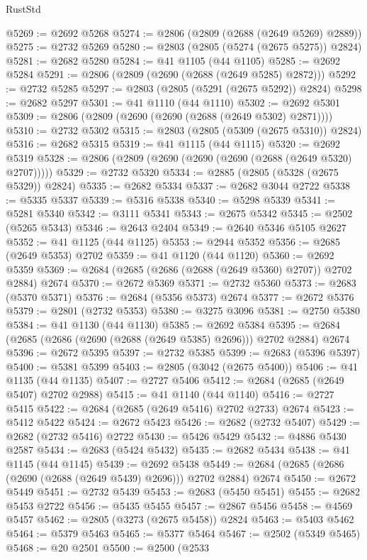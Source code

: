 \begin{lexlean}{RustStd}
\begin{coremodule}
@5269 := @2692 @5268
@5274 := @2806 (@2809 (@2688 (@2649 @5269) @2889))
@5275 := @2732 @5269
@5280 := @2803 (@2805 (@5274 (@2675 @5275)) @2824)
@5281 := @2682 @5280
@5284 := @41 @1105 (@44 @1105)
@5285 := @2692 @5284
@5291 := @2806 (@2809 (@2690 (@2688 (@2649 @5285) @2872)))
@5292 := @2732 @5285
@5297 := @2803 (@2805 (@5291 (@2675 @5292)) @2824)
@5298 := @2682 @5297
@5301 := @41 @1110 (@44 @1110)
@5302 := @2692 @5301
@5309 := @2806 (@2809 (@2690 (@2690 (@2688 (@2649 @5302) @2871))))
@5310 := @2732 @5302
@5315 := @2803 (@2805 (@5309 (@2675 @5310)) @2824)
@5316 := @2682 @5315
@5319 := @41 @1115 (@44 @1115)
@5320 := @2692 @5319
@5328 := @2806 (@2809 (@2690 (@2690 (@2690 (@2688 (@2649 @5320) @2707)))))
@5329 := @2732 @5320
@5334 := @2885 (@2805 (@5328 (@2675 @5329)) @2824)
@5335 := @2682 @5334
@5337 := @2682 @3044 @2722
@5338 := @5335 @5337
@5339 := @5316 @5338
@5340 := @5298 @5339
@5341 := @5281 @5340
@5342 := @3111 @5341
@5343 := @2675 @5342
@5345 := @2502 (@5265 @5343)
@5346 := @2643 @2404
@5349 := @2640 @5346 @5105 @2627
@5352 := @41 @1125 (@44 @1125)
@5353 := @2944 @5352
@5356 := @2685 (@2649 @5353) @2702
@5359 := @41 @1120 (@44 @1120)
@5360 := @2692 @5359
@5369 := @2684 (@2685 (@2686 (@2688 (@2649 @5360) @2707)) @2702 @2884) @2674
@5370 := @2672 @5369
@5371 := @2732 @5360
@5373 := @2683 (@5370 @5371)
@5376 := @2684 (@5356 @5373) @2674
@5377 := @2672 @5376
@5379 := @2801 (@2732 @5353)
@5380 := @3275 @3096
@5381 := @2750 @5380
@5384 := @41 @1130 (@44 @1130)
@5385 := @2692 @5384
@5395 := @2684 (@2685 (@2686 (@2690 (@2688 (@2649 @5385) @2696))) @2702 @2884) @2674
@5396 := @2672 @5395
@5397 := @2732 @5385
@5399 := @2683 (@5396 @5397)
@5400 := @5381 @5399
@5403 := @2805 (@3042 (@2675 @5400))
@5406 := @41 @1135 (@44 @1135)
@5407 := @2727 @5406
@5412 := @2684 (@2685 (@2649 @5407) @2702 @2988)
@5415 := @41 @1140 (@44 @1140)
@5416 := @2727 @5415
@5422 := @2684 (@2685 (@2649 @5416) @2702 @2733) @2674
@5423 := @5412 @5422
@5424 := @2672 @5423
@5426 := @2682 (@2732 @5407)
@5429 := @2682 (@2732 @5416) @2722
@5430 := @5426 @5429
@5432 := @4886 @5430 @2587
@5434 := @2683 (@5424 @5432)
@5435 := @2682 @5434
@5438 := @41 @1145 (@44 @1145)
@5439 := @2692 @5438
@5449 := @2684 (@2685 (@2686 (@2690 (@2688 (@2649 @5439) @2696))) @2702 @2884) @2674
@5450 := @2672 @5449
@5451 := @2732 @5439
@5453 := @2683 (@5450 @5451)
@5455 := @2682 @5453 @2722
@5456 := @5435 @5455
@5457 := @2867 @5456
@5458 := @4569 @5457
@5462 := @2805 (@3273 (@2675 @5458)) @2824
@5463 := @5403 @5462
@5464 := @5379 @5463
@5465 := @5377 @5464
@5467 := @2502 (@5349 @5465)
@5468 := @20 @2501
@5500 := @2500
    (@2533

\end{coremodule}
\end{lexlean}
